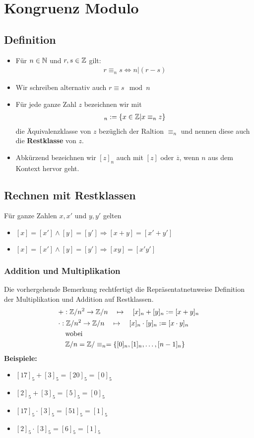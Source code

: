 \section{Kongruenz Modulo}
\subsection{Definition}
\begin{itemize}
	\item Für $n \in \mathbb{N}$ und $r,s \in \mathbb{Z}$ gilt:
	      \begin{align*}
		      r \equiv_n s \Leftrightarrow n|(r-s)
	      \end{align*}
	\item Wir schreiben alternativ auch $r \equiv s \mod n$
	\item Für jede ganze Zahl $z$ bezeichnen wir mit
	      \begin{align*}
		      [z]_n := \{x \in \Z | x \equiv_n z\}
	      \end{align*}
	      die Äquivalenzklasse von $z$ bezüglich der Raltion $\equiv_n$ und nennen diese auch die \textbf{Restklasse} von $z$.
	\item Abkürzend bezeichnen wir $[z]_n$ auch mit $[z]$ oder $\overline{z}$, wenn $n$ aus
	      dem Kontext hervor geht.
\end{itemize}
\subsection{Rechnen mit Restklassen}
Für ganze Zahlen $x ,x'$ und $y, y'$ gelten
\begin{itemize}
	\item $[x] = [x'] \land [y] = [y'] \Rightarrow [x + y] = [x' + y']$
	\item $[x] = [x'] \land [y] = [y'] \Rightarrow [xy] = [x'y']$
\end{itemize}
\subsubsection{Addition und Multiplikation}
Die vorhergehende Bemerkung rechtfertigt die
Repräsentatnetnweise Definition der Multiplikation und Addition
auf Restklassen.
\begin{align*}
	 & + : \mathbb{Z}/n{^2} \to \mathbb{Z}/n \quad \mapsto \quad [x]_n + [y]_n := [x + y]_n             \\
	 & \cdot : \mathbb{Z}/n{^2} \to \mathbb{Z}/n \quad \mapsto \quad [x]_n \cdot [y]_n := [x \cdot y]_n \\
	 & \quad \text{wobei}                                                               \\
	 & \quad \mathbb{Z}/n = \mathbb{Z}/ \equiv_n = \{[0]_n, [1]_n, \ldots, [n-1]_n\}
\end{align*}
\textbf{Beispiele:}\\
\begin{itemize}
	\item $[17]_5 + [3]_5 = [20]_5 = [0]_5$
	\item $[2]_5 + [3]_5 = [5]_5 = [0]_5$
	\item $[17]_5 \cdot [3]_5 = [51]_5 = [1]_5$
	\item $[2]_5 \cdot [3]_5 = [6]_5 = [1]_5$
\end{itemize}
